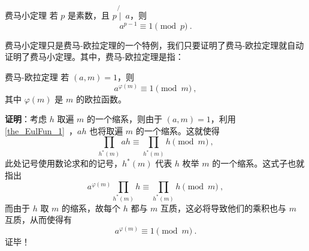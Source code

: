 

\begin{theorem}{费马小定理}
若 $p$ 是素数，且 $p \not{\mid}~ a$，则
\begin{equation}
a^{p-1} \equiv 1 \pmod p ~.
\end{equation}
\end{theorem}

费马小定理只是费马-欧拉定理的一个特例，我们只要证明了费马-欧拉定理就自动证明了费马小定理。其中，费马-欧拉定理是指：
\begin{theorem}{费马-欧拉定理}
若 $(a, m) = 1$，则
\begin{equation}
a^{\varphi(m)} \equiv 1 \pmod m ~,
\end{equation}
其中 $\varphi(m)$ 是 $m$ 的欧拉函数。
\end{theorem}
\textbf{证明}：考虑 $h$ 取遍 $m$ 的一个缩系，则由于 $(a, m) = 1$，利用\autoref{the_EulFun_1}~，$ah$ 也将取遍 $m$ 的一个缩系。这就使得
\begin{equation}
\prod_{h^*(m)}{a h} \equiv \prod _{h^*(m)}h \pmod m ~,
\end{equation}
此处记号使用数论求和的记号，$h^*(m)$ 代表 $h$ 枚举 $m$ 的一个缩系。这式子也就指出
\begin{equation}
a^{\varphi(m)} \prod_{h^*(m)} h \equiv \prod_{h^*(m)} h \pmod m ~,
\end{equation}
而由于 $h$ 取 $m$ 的缩系，故每个 $h$ 都与 $m$ 互质，这必将导致他们的乘积也与 $m$ 互质，从而使得有
\begin{equation}
a^{\varphi(m)} \equiv 1 \pmod m ~.
\end{equation}
证毕！



